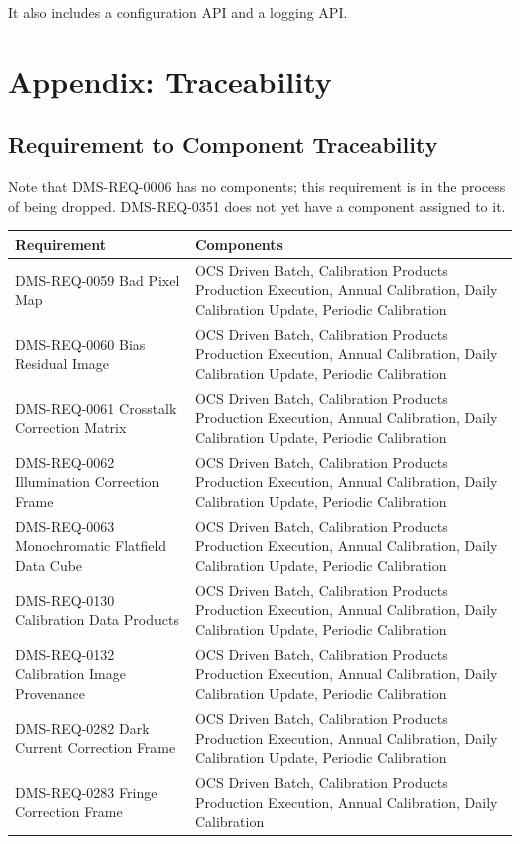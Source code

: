 \documentclass[DM,lsstdraft,toc]{lsstdoc}
\begin{document}
It also includes a configuration API and a logging API.

\section{Appendix: Traceability}\label{appendix-traceability}

\subsection{Requirement to Component
Traceability}\label{requirement-to-component-traceability}

Note that DMS-REQ-0006 has no components; this requirement is in the
process of being dropped. DMS-REQ-0351 does not yet have a component
assigned to it.

\begin{longtable}[]{@{}ll@{}}
\toprule
Requirement & Components\tabularnewline
\midrule
\endhead
DMS-REQ-0059 Bad Pixel Map & OCS Driven Batch, Calibration Products
Production Execution, Annual Calibration, Daily Calibration Update,
Periodic Calibration\tabularnewline
DMS-REQ-0060 Bias Residual Image & OCS Driven Batch, Calibration
Products Production Execution, Annual Calibration, Daily Calibration
Update, Periodic Calibration\tabularnewline
DMS-REQ-0061 Crosstalk Correction Matrix & OCS Driven Batch, Calibration
Products Production Execution, Annual Calibration, Daily Calibration
Update, Periodic Calibration\tabularnewline
DMS-REQ-0062 Illumination Correction Frame & OCS Driven Batch,
Calibration Products Production Execution, Annual Calibration, Daily
Calibration Update, Periodic Calibration\tabularnewline
DMS-REQ-0063 Monochromatic Flatfield Data Cube & OCS Driven Batch,
Calibration Products Production Execution, Annual Calibration, Daily
Calibration Update, Periodic Calibration\tabularnewline
DMS-REQ-0130 Calibration Data Products & OCS Driven Batch, Calibration
Products Production Execution, Annual Calibration, Daily Calibration
Update, Periodic Calibration\tabularnewline
DMS-REQ-0132 Calibration Image Provenance & OCS Driven Batch,
Calibration Products Production Execution, Annual Calibration, Daily
Calibration Update, Periodic Calibration\tabularnewline
DMS-REQ-0282 Dark Current Correction Frame & OCS Driven Batch,
Calibration Products Production Execution, Annual Calibration, Daily
Calibration Update, Periodic Calibration\tabularnewline
DMS-REQ-0283 Fringe Correction Frame & OCS Driven Batch, Calibration
Products Production Execution, Annual Calibration, Daily Calibration

\end{longtable}
\end{document}
